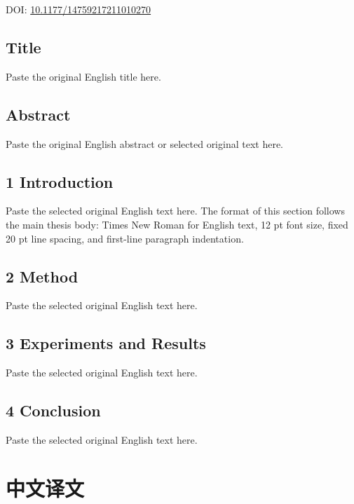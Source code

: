 \documentclass[12pt,openany,oneside,fontset=none]{ctexbook}
\begin{document}
\noindent DOI: \href{https://doi.org/10.1177/14759217211010270}{10.1177/14759217211010270}

\vspace{1em}

\section*{Title}

Paste the original English title here.

\section*{Abstract}

Paste the original English abstract or selected original text here.

\section*{1 Introduction}

Paste the selected original English text here. The format of this section follows the main thesis body: Times New Roman for English text, 12 pt font size, fixed 20 pt line spacing, and first-line paragraph indentation.

\section*{2 Method}

Paste the selected original English text here.

\section*{3 Experiments and Results}

Paste the selected original English text here.

\section*{4 Conclusion}

Paste the selected original English text here.

\clearpage

\chapter*{中文译文}
\end{document}

